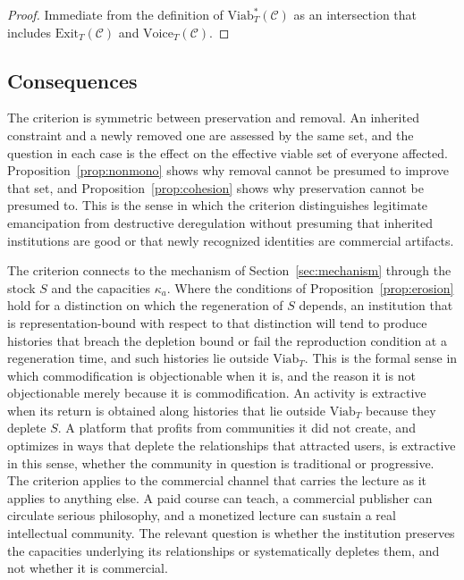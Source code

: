 \documentclass[12pt]{article}
\begin{document}
\begin{proof}
Immediate from the definition of $\mathrm{Viab}^{*}_T(\mathcal C)$ as an intersection that includes $\mathrm{Exit}_T(\mathcal C)$ and $\mathrm{Voice}_T(\mathcal C)$.
\end{proof}

\subsection{Consequences}

The criterion is symmetric between preservation and removal. An inherited constraint and a newly removed one are assessed by the same set, and the question in each case is the effect on the effective viable set of everyone affected. Proposition~\ref{prop:nonmono} shows why removal cannot be presumed to improve that set, and Proposition~\ref{prop:cohesion} shows why preservation cannot be presumed to. This is the sense in which the criterion distinguishes legitimate emancipation from destructive deregulation without presuming that inherited institutions are good or that newly recognized identities are commercial artifacts.

The criterion connects to the mechanism of Section~\ref{sec:mechanism} through the stock $S$ and the capacities $\kappa_a$. Where the conditions of Proposition~\ref{prop:erosion} hold for a distinction on which the regeneration of $S$ depends, an institution that is representation-bound with respect to that distinction will tend to produce histories that breach the depletion bound or fail the reproduction condition at a regeneration time, and such histories lie outside $\mathrm{Viab}_T$. This is the formal sense in which commodification is objectionable when it is, and the reason it is not objectionable merely because it is commodification. An activity is extractive when its return is obtained along histories that lie outside $\mathrm{Viab}_T$ because they deplete $S$. A platform that profits from communities it did not create, and optimizes in ways that deplete the relationships that attracted users, is extractive in this sense, whether the community in question is traditional or progressive. The criterion applies to the commercial channel that carries the lecture as it applies to anything else. A paid course can teach, a commercial publisher can circulate serious philosophy, and a monetized lecture can sustain a real intellectual community. The relevant question is whether the institution preserves the capacities underlying its relationships or systematically depletes them, and not whether it is commercial.
\end{document}
